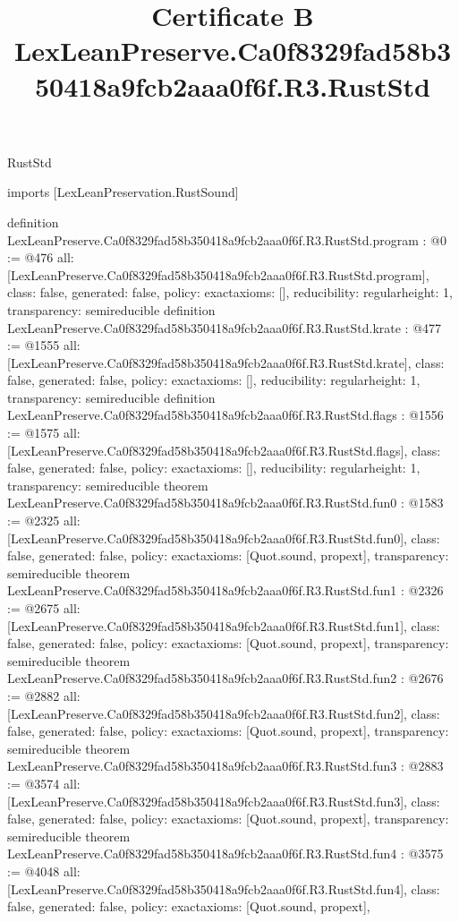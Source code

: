 \begin{lexlean}{RustStd}
\title{Certificate B LexLeanPreserve.Ca0f8329fad58b350418a9fcb2aaa0f6f.R3.RustStd}
\begin{coremodule}
imports [LexLeanPreservation.RustSound]

definition LexLeanPreserve.Ca0f8329fad58b350418a9fcb2aaa0f6f.R3.RustStd.program : @0 := @476 {
  all: [LexLeanPreserve.Ca0f8329fad58b350418a9fcb2aaa0f6f.R3.RustStd.program],
  class: false,
  generated: false,
  policy: exact{axioms: []},
  reducibility: regular{height: 1},
  transparency: semireducible
}
definition LexLeanPreserve.Ca0f8329fad58b350418a9fcb2aaa0f6f.R3.RustStd.krate : @477 := @1555 {
  all: [LexLeanPreserve.Ca0f8329fad58b350418a9fcb2aaa0f6f.R3.RustStd.krate],
  class: false,
  generated: false,
  policy: exact{axioms: []},
  reducibility: regular{height: 1},
  transparency: semireducible
}
definition LexLeanPreserve.Ca0f8329fad58b350418a9fcb2aaa0f6f.R3.RustStd.flags : @1556 := @1575 {
  all: [LexLeanPreserve.Ca0f8329fad58b350418a9fcb2aaa0f6f.R3.RustStd.flags],
  class: false,
  generated: false,
  policy: exact{axioms: []},
  reducibility: regular{height: 1},
  transparency: semireducible
}
theorem LexLeanPreserve.Ca0f8329fad58b350418a9fcb2aaa0f6f.R3.RustStd.fun0 : @1583 := @2325 {
  all: [LexLeanPreserve.Ca0f8329fad58b350418a9fcb2aaa0f6f.R3.RustStd.fun0],
  class: false,
  generated: false,
  policy: exact{axioms: [Quot.sound, propext]},
  transparency: semireducible
}
theorem LexLeanPreserve.Ca0f8329fad58b350418a9fcb2aaa0f6f.R3.RustStd.fun1 : @2326 := @2675 {
  all: [LexLeanPreserve.Ca0f8329fad58b350418a9fcb2aaa0f6f.R3.RustStd.fun1],
  class: false,
  generated: false,
  policy: exact{axioms: [Quot.sound, propext]},
  transparency: semireducible
}
theorem LexLeanPreserve.Ca0f8329fad58b350418a9fcb2aaa0f6f.R3.RustStd.fun2 : @2676 := @2882 {
  all: [LexLeanPreserve.Ca0f8329fad58b350418a9fcb2aaa0f6f.R3.RustStd.fun2],
  class: false,
  generated: false,
  policy: exact{axioms: [Quot.sound, propext]},
  transparency: semireducible
}
theorem LexLeanPreserve.Ca0f8329fad58b350418a9fcb2aaa0f6f.R3.RustStd.fun3 : @2883 := @3574 {
  all: [LexLeanPreserve.Ca0f8329fad58b350418a9fcb2aaa0f6f.R3.RustStd.fun3],
  class: false,
  generated: false,
  policy: exact{axioms: [Quot.sound, propext]},
  transparency: semireducible
}
theorem LexLeanPreserve.Ca0f8329fad58b350418a9fcb2aaa0f6f.R3.RustStd.fun4 : @3575 := @4048 {
  all: [LexLeanPreserve.Ca0f8329fad58b350418a9fcb2aaa0f6f.R3.RustStd.fun4],
  class: false,
  generated: false,
  policy: exact{axioms: [Quot.sound, propext]},
}
\end{coremodule}
\end{lexlean}
